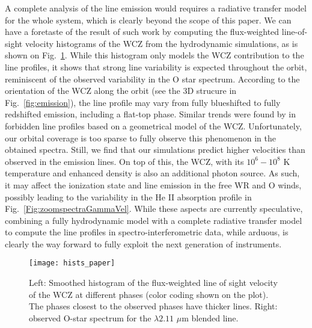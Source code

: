 \documentclass[usenatbib]{mnras}%
\begin{document}
A complete analysis of the line emission would requires a radiative transfer model for the whole system, which is clearly beyond the scope of this paper. We can have a foretaste of the result of such work by computing the flux-weighted line-of-sight velocity histograms of the WCZ from the hydrodynamic simulations, as is shown on Fig.~\ref{fig:histograms}. While this histogram only models the WCZ contribution to the line profiles, it shows that strong line variability is expected throughout the orbit, reminiscent of the observed variability in the O star spectrum.  According to the orientation of the WCZ along the orbit (see the 3D strucure in Fig.~\ref{fig:emission}), the line profile may vary from fully blueshifted to fully redshifted emission, including a flat-top phase. Similar trends were found by \citet{2009MNRAS.395..962I} in  forbidden line profiles based on a geometrical model of the WCZ. Unfortunately, our orbital coverage is too sparse to fully observe this phenomenon in the obtained spectra. Still, we find that our simulations predict higher velocities than observed in the emission lines.  On top of this, the WCZ, with its $10^6-10^8$ K temperature and enhanced density is also an additional photon source. As such, it may affect the ionization state and line emission in the free WR and O winds, possibly leading to the variability in the He II absorption profile in Fig.~\ref{Fig:zoomspectraGammaVel}. While these aspects are currently speculative, combining a fully hydrodynamic model with a complete radiative transfer model to compute the line profiles in spectro-interferometric data, while arduous, is clearly the way forward to fully exploit the next generation of instruments.

 \begin{figure}
   \centering
  \texttt{[image: hists\_paper]}
    \caption{Left: Smoothed histogram of the flux-weighted line of sight velocity of the WCZ at different phases (color coding shown on the plot). The phases closest to the observed phases have thicker lines. Right: observed O-star spectrum for the  $\lambda 2.11$ $\mu$m blended line.}
  \label{fig:histograms}
\end{figure}
\end{document}
